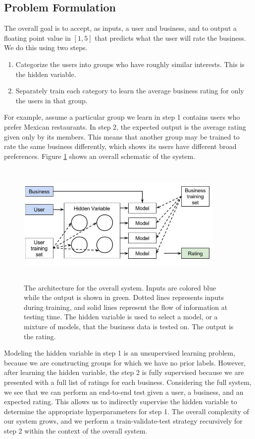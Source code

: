 \documentclass[11pt]{article}
\begin{document}
\subsection{Problem Formulation}
The overall goal is to accept, as inputs, a user and business, and to output a floating point value in $[1, 5]$ that predicts what the user will rate the business. We do this using two steps.

\begin{enumerate}
\item Categorize the users into groups who have roughly similar interests. This is the hidden variable.
\item Separately train each category to learn the average business rating for only the users in that group.
\end{enumerate}

For example, assume a particular group we learn in step 1 contains users who prefer Mexican restaurants. In step 2, the expected output is the average rating given only by its members. This means that another group may be trained to rate the same business differently, which shows its users have different broad preferences. Figure \ref{fig:system} shows an overall schematic of the system.\\

\begin{figure}[h!]
    \centering
    \includegraphics[width=0.9\textwidth, height=6cm]{system}
    \caption{The architecture for the overall system. Inputs are colored blue while the output is shown in green. Dotted lines represents inputs during training, and solid lines represent the flow of information at testing time. The hidden variable is used to select a model, or a mixture of models, that the business data is tested on. The output is the rating.}
    \label{fig:system}
\end{figure} 

Modeling the hidden variable in step 1 is an unsupervised learning problem, because we are constructing groups for which we have no prior labels. However, after learning the hidden variable, the step 2 is fully supervised because we are presented with a full list of ratings for each business. Considering the full system, we see that we can perform an end-to-end test given a user, a business, and an expected rating. This allows us to indirectly supervise the hidden variable to determine the appropriate hyperparameters for step 1. The overall complexity of our system grows, and we perform a train-validate-test strategy recursively for step 2 within the context of the overall system.
\end{document}
